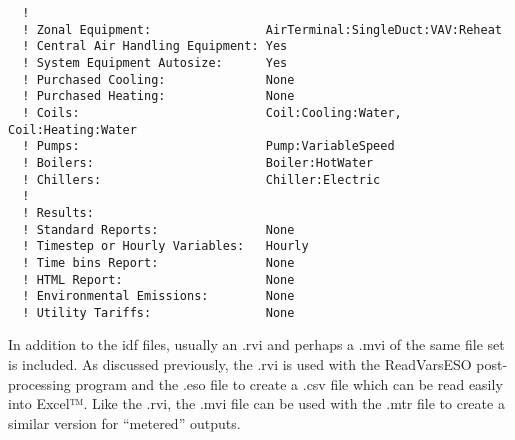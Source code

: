\begin{lstlisting}
  !
  ! Zonal Equipment:                AirTerminal:SingleDuct:VAV:Reheat
  ! Central Air Handling Equipment: Yes
  ! System Equipment Autosize:      Yes
  ! Purchased Cooling:              None
  ! Purchased Heating:              None
  ! Coils:                          Coil:Cooling:Water, Coil:Heating:Water
  ! Pumps:                          Pump:VariableSpeed
  ! Boilers:                        Boiler:HotWater
  ! Chillers:                       Chiller:Electric
  !
  ! Results:
  ! Standard Reports:               None
  ! Timestep or Hourly Variables:   Hourly
  ! Time bins Report:               None
  ! HTML Report:                    None
  ! Environmental Emissions:        None
  ! Utility Tariffs:                None
\end{lstlisting}

In addition to the idf files, usually an .rvi and perhaps a .mvi of the same file set is included. As discussed previously, the .rvi is used with the ReadVarsESO post-processing program and the .eso file to create a .csv file which can be read easily into Excel™. Like the .rvi, the .mvi file can be used with the .mtr file to create a similar version for ``metered'' outputs.
